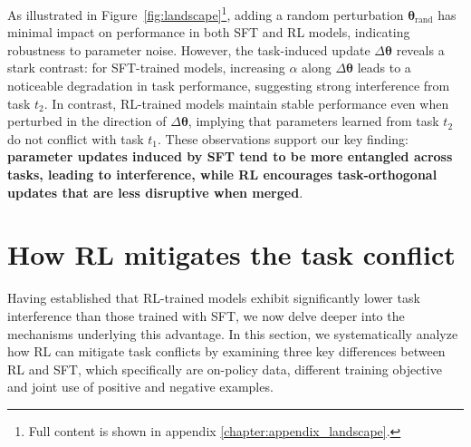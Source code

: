 \documentclass{article} %
\begin{document}
As illustrated in Figure~\ref{fig:landscape}\footnote{Full content is shown in appendix \ref{chapter:appendix_landscape}.}, adding a random perturbation $\bm{\theta}_{\text{rand}}$ has minimal impact on performance in both SFT and RL models, indicating robustness to parameter noise. However, the task-induced update $\Delta\bm{\theta}$ reveals a stark contrast: for SFT-trained models, increasing $\alpha$ along $\Delta\bm{\theta}$ leads to a noticeable degradation in task performance, suggesting strong interference from task $t_2$. In contrast, RL-trained models maintain stable performance even when perturbed in the direction of $\Delta\bm{\theta}$, implying that parameters learned from task $t_2$ do not conflict with task $t_1$. These observations support our key finding: \textbf{parameter updates induced by SFT tend to be more entangled across tasks, leading to interference, while RL encourages task-orthogonal updates that are less disruptive when merged}.



\section{How RL mitigates the task conflict}
Having established that RL-trained models exhibit significantly lower task interference than those trained with SFT, we now delve deeper into the mechanisms underlying this advantage. In this section, we systematically analyze how RL can mitigate task conflicts by examining three key differences between RL and SFT, which specifically are on-policy data, different training objective and joint use of positive and negative examples.




\end{document}
